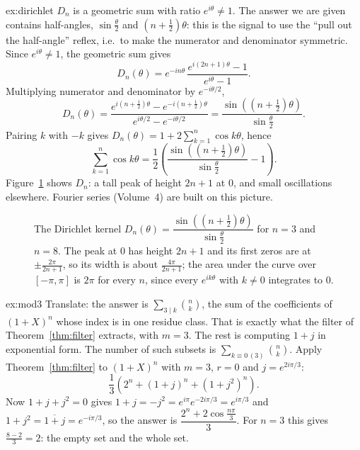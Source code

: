 \begin{solution}{ex:dirichlet}
\idea $D_n$ is a geometric sum with ratio $e^{i\theta}\ne1$. The answer we are given contains half-angles, $\sin\frac\theta2$ and $(n+\frac12)\theta$: this is the signal to use the ``pull out the half-angle'' reflex, i.e.\ to make the numerator and denominator symmetric.
\writeup Since $e^{i\theta}\ne1$, the geometric sum gives
\[
D_n(\theta)=e^{-in\theta}\,\frac{e^{i(2n+1)\theta}-1}{e^{i\theta}-1}.
\]
Multiplying numerator and denominator by $e^{-i\theta/2}$,
\[
D_n(\theta)=\frac{e^{i(n+\frac12)\theta}-e^{-i(n+\frac12)\theta}}{e^{i\theta/2}-e^{-i\theta/2}}
=\frac{\sin\left((n+\frac12)\theta\right)}{\sin\frac\theta2}.
\]
Pairing $k$ with $-k$ gives $D_n(\theta)=1+2\sum_{k=1}^n\cos k\theta$, hence
\[
\sum_{k=1}^n\cos k\theta
=\frac12\left(\frac{\sin\left((n+\frac12)\theta\right)}{\sin\frac\theta2}-1\right).
\]
Figure~\ref{fig:dirichlet} shows $D_n$: a tall peak of height $2n+1$ at $0$, and small oscillations elsewhere. Fourier series (Volume~4) are built on this picture.
\end{solution}

\begin{figure}[ht]
\centering
{}
\caption{The Dirichlet kernel $D_n(\theta)=\dfrac{\sin\left((n+\frac12)\theta\right)}{\sin\frac\theta2}$ for $n=3$ and $n=8$. The peak at $0$ has height $2n+1$ and its first zeros are at $\pm\frac{2\pi}{2n+1}$, so its width is about $\frac{4\pi}{2n+1}$; the area under the curve over $[-\pi,\pi]$ is $2\pi$ for every $n$, since every $e^{ik\theta}$ with $k\ne0$ integrates to $0$.}
\label{fig:dirichlet}
\end{figure}

\begin{solution}{ex:mod3}
\idea Translate: the answer is $\sum_{3\mid k}\binom nk$, the sum of the coefficients of $(1+X)^n$ whose index is in one residue class. That is exactly what the filter of Theorem~\ref{thm:filter} extracts, with $m=3$. The rest is computing $1+j$ in exponential form.
\writeup The number of such subsets is $\sum_{k\equiv0\,(3)}\binom nk$. Apply Theorem~\ref{thm:filter} to $(1+X)^n$ with $m=3$, $r=0$ and
$j=e^{2i\pi/3}$:
\[
\frac13\left(2^n+(1+j)^n+(1+j^2)^n\right).
\]
Now $1+j+j^2=0$ gives $1+j=-j^2=e^{i\pi}e^{-2i\pi/3}=e^{i\pi/3}$ and $1+j^2=\overline{1+j}=e^{-i\pi/3}$, so the answer is $\dfrac{2^n+2\cos\frac{n\pi}3}3$.
For $n=3$ this gives $\frac{8-2}3=2$: the empty set and the whole set.
\end{solution}

